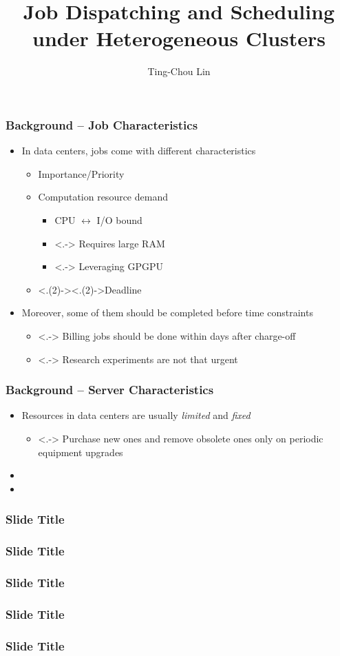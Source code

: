 \documentclass{beamer}
\title{Job Dispatching and Scheduling under Heterogeneous Clusters}
\author{Ting-Chou Lin}
\begin{document}
\begin{frame}
  \titlepage
  \label{title-page}
\end{frame}
\begin{frame}
  \frametitle{Background -- Job Characteristics}
  \begin{itemize}[<+->]
    \item In data centers, jobs come with different characteristics
      \begin{itemize}
        \item Importance/Priority
        \item Computation resource demand
          \begin{itemize}
            \item CPU $\leftrightarrow$ I/O bound
            \item <.-> Requires large RAM
            \item <.-> Leveraging GPGPU
          \end{itemize}
        \item <.(2)->{\alert<.(2)->{Deadline}}
      \end{itemize}
    \item Moreover, some of them should be completed before time
      constraints
      \begin{itemize}
        \item <.-> Billing jobs should be done within days after charge-off
        \item <.-> Research experiments are not that urgent
      \end{itemize}
  \end{itemize}
\end{frame}
\begin{frame} [<+->]
  \frametitle{Background -- Server Characteristics}
  \begin{itemize}
    \item Resources in data centers are usually \emph{limited} and
      \emph{fixed}
      \begin{itemize}
        \item <.-> Purchase new ones and remove obsolete ones only on
          periodic equipment upgrades
      \end{itemize}
    \item
    \item
  \end{itemize}
\end{frame}
\begin{frame}
  \frametitle{Slide Title}
\end{frame}
\begin{frame}
  \frametitle{Slide Title}
\end{frame}
\begin{frame}
  \frametitle{Slide Title}
\end{frame}
\begin{frame}
  \frametitle{Slide Title}
\end{frame}
\begin{frame}
  \frametitle{Slide Title}
\end{frame}
\end{document}
